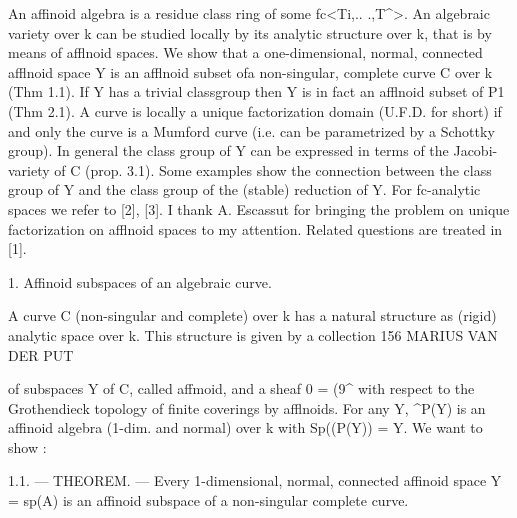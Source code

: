 \documentclass[
  10pt,
]{article}
\newenvironment{Shaded}{}{}
\newcommand{\NormalTok}[1]{#1}
\begin{document}
\begin{Shaded}
\begin{Highlighting}[]
\NormalTok{An affinoid algebra is a residue class ring of some fc\textless{}Ti,.. .,T\^{}\textgreater{}. An}
\NormalTok{algebraic variety over k can be studied locally by its analytic structure over}
\NormalTok{k, that is by means of afflnoid spaces.}
\NormalTok{    We show that a one{-}dimensional, normal, connected afflnoid space Y is}
\NormalTok{an afflnoid subset ofa non{-}singular, complete curve C over k (Thm 1.1). If}
\NormalTok{Y has a trivial classgroup then Y is in fact an afflnoid subset of P1}
\NormalTok{(Thm 2.1). A curve is locally a unique factorization domain (U.F.D.}
\NormalTok{for short) if and only the curve is a Mumford curve (i.e. can be}
\NormalTok{parametrized by a Schottky group). In general the class group of Y}
\NormalTok{can be expressed in terms of the Jacobi{-}variety of C (prop. 3.1).}
\NormalTok{    Some examples show the connection between the class group of Y and}
\NormalTok{the class group of the (stable) reduction of Y. For fc{-}analytic spaces we refer}
\NormalTok{to}
\NormalTok{    [2], [3]. I thank A. Escassut for bringing the problem on unique}
\NormalTok{factorization on afflnoid spaces to my attention. Related questions are treated}
\NormalTok{in [1].}

\NormalTok{                 1. Affinoid subspaces of an algebraic curve.}

\NormalTok{     A curve C (non{-}singular and complete) over k has a natural structure as}
\NormalTok{(rigid) analytic space over k. This structure is given by a collection}
\NormalTok{156                       MARIUS VAN DER PUT}


\NormalTok{of subspaces Y of C, called affmoid, and a sheaf 0 = (9\^{} with}
\NormalTok{respect to the Grothendieck topology of finite coverings by afflnoids.}
\NormalTok{For any Y, \^{}P(Y) is an affinoid algebra (1{-}dim. and normal) over k}
\NormalTok{with Sp((P(Y)) = Y. We want to show :}

\NormalTok{   1.1. — THEOREM. — Every 1{-}dimensional, normal, connected affinoid space}
\NormalTok{Y = sp(A) is an affinoid subspace of a non{-}singular complete curve.}


\end{Highlighting}
\end{Shaded}
\end{document}
